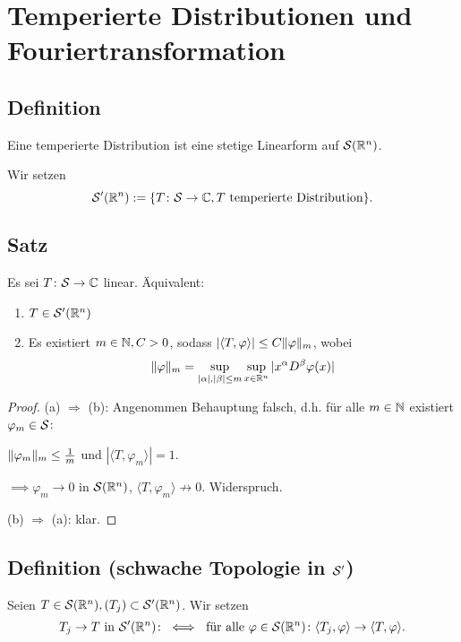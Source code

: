 \section{Temperierte Distributionen und Fouriertransformation}

\subsection{Definition}

Eine temperierte Distribution ist eine stetige Linearform auf $\mathcal{S}(\mathbb{R}^n)$.

Wir setzen
$$
\mathcal{S}'(\mathbb{R}^n) := \{T \colon \mathcal{S} \to \mathbb{C}, T \text{ temperierte Distribution}\}.
$$

\subsection{Satz}

Es sei $T \colon \mathcal{S} \to \mathbb{C}$ linear. Äquivalent:
\begin{enumerate}
  \item $T \in \mathcal{S}'(\mathbb{R}^n)$
  \item Es existiert $m \in \mathbb{N}, C>0$, sodass $|\langle T, \varphi \rangle| \leq C \lVert \varphi \rVert_m$, wobei
    $$
    \lVert \varphi \rVert_m = \sup_{|\alpha|, |\beta| \leq m} \sup_{x \in \mathbb{R}^n} |x^\alpha D^\beta \varphi(x)|
    $$
\end{enumerate}

\begin{proof}
  (a) $\Rightarrow$ (b): Angenommen Behauptung falsch, d.h. für alle $m \in \mathbb{N}$ existiert $\varphi_m \in \mathcal{S}$:

  $\lVert \varphi_m \rVert_m \leq \frac{1}{m}$ und $|\langle T, \varphi_m \rangle| = 1$.

  $\implies \varphi_m \to 0$ in $\mathcal{S}(\mathbb{R}^n)$, $\langle T, \varphi_m \rangle \not\to 0$.
  Widerspruch.

  (b) $\Rightarrow$ (a): klar.
\end{proof}

\subsection{Definition (schwache Topologie in $\mathcal{S}'$)}

Seien $T \in \mathcal{S}(\mathbb{R}^n), (T_j) \subset \mathcal{S}'(\mathbb{R}^n)$. 
Wir setzen 
$$
T_j \to T \text{ in } \mathcal{S}'(\mathbb{R}^n) \colon \iff \text{ für alle } \varphi \in \mathcal{S}(\mathbb{R}^n) \colon \langle T_j, \varphi \rangle \to \langle T, \varphi \rangle.
$$

